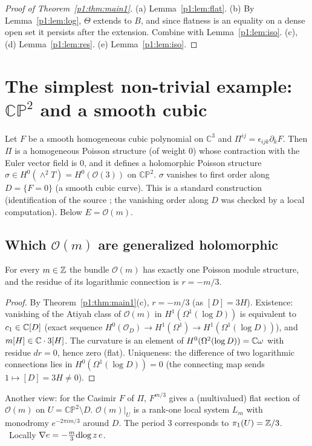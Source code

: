 \begin{proof}[Proof of Theorem~\ref{p1:thm:main1}]
(a) Lemma~\ref{p1:lem:flat}. (b) By Lemma~\ref{p1:lem:log}, $\Theta$ extends to $B$, and since flatness is an equality on a dense open set it persists after the extension. Combine with Lemma~\ref{p1:lem:iso}. (c), (d) Lemma~\ref{p1:lem:res}. (e) Lemma~\ref{p1:lem:iso}.
\end{proof}

\section{The simplest non-trivial example: $\mathbb{CP}^2$ and a smooth cubic}\label{p1:sec:cp2}
Let $F$ be a smooth homogeneous cubic polynomial on $\mathbb C^3$ and $\Pi^{ij}=\epsilon_{ijk}\partial_kF$. Then $\Pi$ is a homogeneous Poisson structure (of weight 0) whose contraction with the Euler vector field is $0$, and it defines a holomorphic Poisson structure $\sigma\in H^0(\wedge^2T)=H^0(\mathcal O(3))$ on $\mathbb{CP}^2$. $\sigma$ vanishes to first order along $D=\{F=0\}$ (a smooth cubic curve). This is a standard construction (identification of the source \tQ; the vanishing order along $D$ was checked by a local computation). Below $E=\mathcal O(m)$.

\subsection{Which $\mathcal O(m)$ are generalized holomorphic}
\begin{prop}\tP\label{p1:prop:cp2mod}
For every $m\in\mathbb Z$ the bundle $\mathcal O(m)$ has exactly one Poisson module structure, and the residue of its logarithmic connection is $r=-m/3$.
\end{prop}
\begin{proof}
By Theorem~\ref{p1:thm:main1}(c), $r=-m/3$ (as $[D]=3H$). Existence: vanishing of the Atiyah class of $\mathcal O(m)$ in $H^1(\Omega^1(\log D))$ is equivalent to $c_1\in\mathbb C[D]$ (exact sequence $H^0(\mathcal O_D)\to H^1(\Omega^1)\to H^1(\Omega^1(\log D))$), and $m[H]\in\mathbb C\cdot3[H]$. The curvature is an element of $H^0(\Omega^2(\log D))=\mathbb C\omega$ with residue $dr=0$, hence zero (flat). Uniqueness: the difference of two logarithmic connections lies in $H^0(\Omega^1(\log D))=0$ (the connecting map sends $1\mapsto[D]=3H\ne0$).\qedhere
\end{proof}
Another view: for the Casimir $F$ of $\Pi$, $F^{m/3}$ gives a (multivalued) flat section of $\mathcal O(m)$ on $U=\mathbb{CP}^2\setminus D$. $\mathcal O(m)|_U$ is a rank-one local system $L_m$ with monodromy $e^{-2\pi im/3}$ around $D$. The period 3 corresponds to $\pi_1(U)=\mathbb Z/3$. \tP\ Locally $\nabla e=-\tfrac m3\mathrm{dlog}\, z\,e$.

